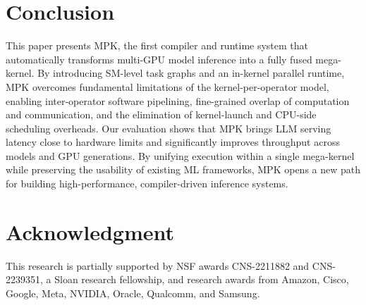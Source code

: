 \documentclass[letterpaper,twocolumn,10pt]{article}
\theoremstyle{definition}
\newcommand{\sys}{MPK\xspace}
\newcommand{\sys}{TGX\xspace}
\begin{document}
\fi








%


\section{Conclusion}
\label{sec:conclusion}


This paper presents \sys, the first compiler and runtime system that automatically transforms multi-GPU model inference into a fully fused mega-kernel. By introducing SM-level task graphs and an in-kernel parallel runtime, \sys overcomes fundamental limitations of the kernel-per-operator model, enabling inter-operator software pipelining, fine-grained overlap of computation and communication, and the elimination of kernel-launch and CPU-side scheduling overheads. Our evaluation shows that \sys brings LLM serving latency close to hardware limits and significantly improves throughput across models and GPU generations. By unifying execution within a single mega-kernel while preserving the usability of existing ML frameworks, \sys opens a new path for building high-performance, compiler-driven inference systems.


\section*{Acknowledgment}
This research is partially supported by NSF awards CNS-2211882 and CNS-2239351, a Sloan research fellowship, and research awards from Amazon, Cisco, Google, Meta, NVIDIA, Oracle, Qualcomm, and Samsung.
%

\balance



%
\end{document}
